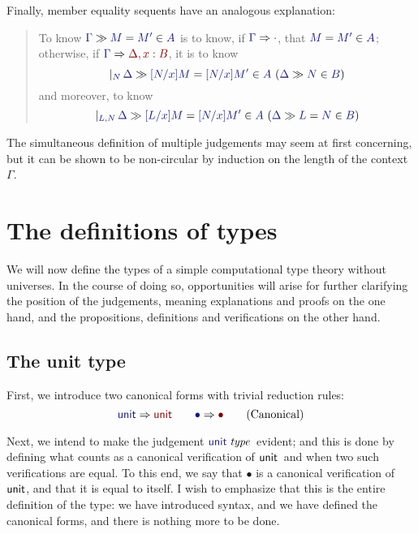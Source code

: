 \documentclass[main.tex]{subfiles}
\begin{document}
Finally, member equality sequents have an analogous explanation:

\begin{quote}
  To know $\sequent{\Gamma}{\ever{M}{M'}{A}}$ is to know, if
  $\reduce{\Gamma}{\cdot}$, that $\ever{M}{M'}{A}$; otherwise, if
  $\reduce{\Gamma}{\Delta,x:B}$, it is to know
  \[
    \genj{N}{
      \hyp{
        \sequent{\Delta}{
          \ever{[N/x]M}{[N/x]M'}{A}
        }
      }{
        \sequent{\Delta}{
          \ver{N}{B}
        }
      }
    }
  \]
  and moreover, to know
  \[
    \genj{L,N}{
      \hyp{
        \sequent{\Delta}{
          \ever{[L/x]M}{[N/x]M'}{A}
        }
      }{
        \sequent{\Delta}{
          \ever{L}{N}{B}
        }
      }
    }
  \]
\end{quote}

The simultaneous definition of multiple judgements may seem at first
concerning, but it can be shown to be non-circular by induction on the length
of the context $\Gamma$.

\section{The definitions of types}

We will now define the types of a simple computational type theory without
universes. In the course of doing so, opportunities will arise for further
clarifying the position of the judgements, meaning explanations and proofs on
the one hand, and the propositions, definitions and verifications on the other
hand.

\subsection{The unit type}

First, we introduce two canonical forms with trivial reduction rules:
\begin{equation}
  \reduce\tyunit\tyunit\qquad
  \reduce\bullet\bullet
  \tag{Canonical}
\end{equation}

Next, we intend to make the judgement $\isset\tyunit$\ evident; and this is done by
defining what counts as a canonical verification of $\mathsf{unit}$\ and when two such
verifications are equal. To this end, we say that $\bullet$ is a canonical
verification of $\mathsf{unit}$, and that it is equal to itself.  I wish to emphasize
that this is the entire definition of the type: we have introduced syntax, and
we have defined the canonical forms, and there is nothing more to be done.
\end{document}
